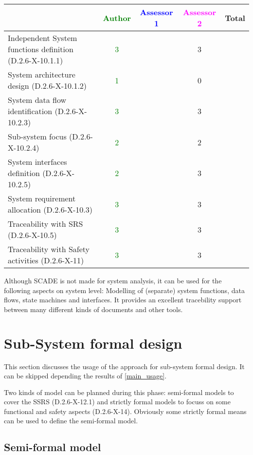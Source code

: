 \begin{tabular}{|l | c | c | c | c|}
\hline
& \textcolor{green}{Author} & \textcolor{blue}{Assessor 1} & \textcolor{magenta}{Assessor 2} & Total \\
\hline
Independent System functions definition (D.2.6-X-10.1.1)  &  \textcolor{green}{3}& &3 &  \\
\hline 
System architecture design (D.2.6-X-10.1.2) & \textcolor{green}{1} & &
0&  \\
\hline
System data flow identification (D.2.6-X-10.2.3)  &  \textcolor{green}{3}& &3 &  \\
\hline
Sub-system focus (D.2.6-X-10.2.4)  &  \textcolor{green}{2}& &2 &  \\
\hline
System interfaces definition (D.2.6-X-10.2.5)  &  \textcolor{green}{2}& &3 &  \\
\hline
System requirement allocation (D.2.6-X-10.3)  &  \textcolor{green}{3}& &3 &  \\
\hline
Traceability with SRS (D.2.6-X-10.5)  &  \textcolor{green}{3}& &3 &  \\
\hline
Traceability with Safety activities (D.2.6-X-11)  & \textcolor{green}{3} & &3 &  \\
\hline
\end{tabular}

\begin{author_comment}
Although SCADE is not made for system analysis, it can be used for the following aspects on system level: Modelling of (separate) system functions, data flows, state machines and interfaces. It provides an excellent tracebility support between many different kinds of documents and other tools.  
\end{author_comment}


\section{Sub-System formal design}
This section discusses the usage of the approach for sub-system formal design.
It can be skipped depending the results of \ref{main_usage}.

Two kinds of model can be planned during this phase: semi-formal models to  cover the SSRS (D.2.6-X-12.1) and strictly formal  models to  focuss on some functional and safety aspects (D.2.6-X-14).  Obviously some strictly  formal means can be used to define the semi-formal  model.

\subsection{Semi-formal model}

